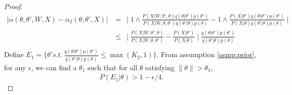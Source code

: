 \begin{proof}
\begin{align*}
|\alpha(\theta, \theta', W, X) - \alpha_I(\theta, \theta', X)| &= \ \mid 1 \wedge \frac{P(X | W, \theta' , \theta)q(\theta | \theta')p(\theta')}{P(X | W, \theta , \theta')q(\theta' | \theta)p(\theta)} - 1 \wedge \frac{P(X | \theta')q(\theta | \theta')p(\theta')}{P(X | \theta)q(\theta' | \theta)p(\theta)} \mid \\
& \leq \ \mid \frac{P(X | W, \theta' , \theta)}{P(X | W, \theta , \theta')} - \frac{P(X | \theta')}{P(X | \theta)} \mid \frac{q(\theta | \theta')p(\theta')}{q(\theta' | \theta)p(\theta)}\\
\end{align*}
Define $E_1 = \{\theta' s.t.\ \frac{q(\theta | \theta')p(\theta')}{q(\theta' | \theta)p(\theta)}\leq \max(K_2, 1)\}$.
From assumption \ref{asmp:prior}, for any $\epsilon$, we can find a
$\theta_1$  such that {for all } $\theta$ satisfying $ \parallel \theta \parallel > \theta_1$,
\begin{align*}
  P(E_1  | \theta) > 1 - \epsilon / 4.
\end{align*}


\end{proof}
